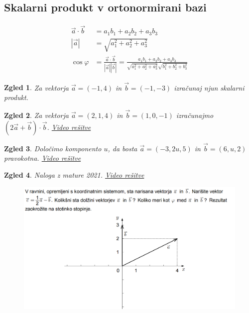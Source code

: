 \documentclass{article}
\newtheorem*{zgled}{Zgled}
\begin{document}
\subsection{Skalarni produkt v ortonormirani bazi}

\begin{align*}
\vec{a}\cdot\vec{b}&=a_1b_1+a_2b_2+a_3b_3\\
|\vec{a}|&=\sqrt{a_1^2+a_2^2+a_3^2}\\
\cos\varphi&=\frac{\vec{a}\cdot\vec{b}}{|\vec{a}||\vec{b}|}=\frac{a_1b_1+a_2b_2+a_3b_3}{\sqrt{a_1^2+a_2^2+a_3^2}\sqrt{b_1^2+b_2^2+b_3^2}}
\end{align*}

\begin{zgled}
    Za vektorja $\vec{a}=(-1,4)$ in $\vec{b}=(-1,-3)$  izračunaj njun skalarni produkt.
\end{zgled}

\begin{zgled}
    Za vektorja $\vec{a}=(2,1,4)$ in $\vec{b}=(1,0,-1)$ izračunajmo $(2\vec{a}+\vec{b})\cdot\vec{b}$.
    \href{https://youtu.be/6Y_1Dqk4n-A}{Video rešitve}
\end{zgled}
\begin{zgled}
    Določimo komponento $u$, da bosta $\vec{a}=(-3,2u,5)$ in $\vec{b}=(6,u,2)$ pravokotna.
    \href{https://youtu.be/5CaojlnF_iI}{Video rešitve}
\end{zgled}
\begin{zgled}
    Naloga z mature 2021. \href{https://youtu.be/Qari4okAS7w}{Video rešitve}
\end{zgled}

\begin{figure}[H]
\includegraphics[width=\textwidth]{vektorji.naloga.png}
\end{figure}
\end{document}
